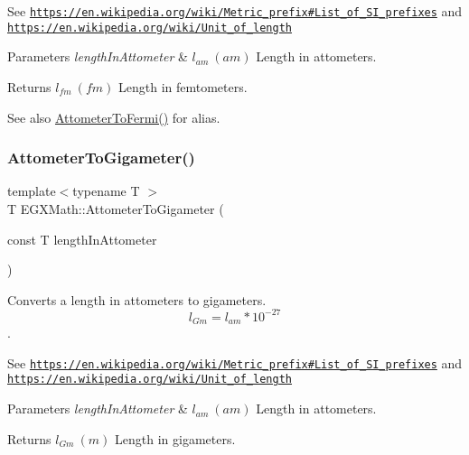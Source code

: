 See \href{https://en.wikipedia.org/wiki/Metric_prefix#List_of_SI_prefixes}{\tt https\+://en.\+wikipedia.\+org/wiki/\+Metric\+\_\+prefix\#\+List\+\_\+of\+\_\+\+S\+I\+\_\+prefixes} and \href{https://en.wikipedia.org/wiki/Unit_of_length}{\tt https\+://en.\+wikipedia.\+org/wiki/\+Unit\+\_\+of\+\_\+length} 
\begin{DoxyParams}{Parameters}
{\em length\+In\+Attometer} & $ l_{am}\ (am)$ Length in attometers. \\
\hline
\end{DoxyParams}
\begin{DoxyReturn}{Returns}
$ l_{fm}\ (fm)$ Length in femtometers. 
\end{DoxyReturn}
\begin{DoxySeeAlso}{See also}
\mbox{\hyperlink{group___e_g_x_math-_conversions-_length_conversions-_s_i-_attometer-_non-_s_i_ga7dc342fa730e646b020d60aa6c2848ef}{Attometer\+To\+Fermi()}} for alias. 
\end{DoxySeeAlso}
\mbox{\label{group___e_g_x_math-_conversions-_length_conversions-_s_i-_attometer-_s_i_ga6d8498c20f3df80b922e6cb076c35fb8}} 
\subsubsection{\texorpdfstring{Attometer\+To\+Gigameter()}{AttometerToGigameter()}}
{\footnotesize\ttfamily template$<$typename T $>$ \\
T E\+G\+X\+Math\+::\+Attometer\+To\+Gigameter (\begin{DoxyParamCaption}\item[{const T}]{length\+In\+Attometer }\end{DoxyParamCaption})}



Converts a length in attometers to gigameters. \[ l_{Gm}=l_{am} * 10^{-27} \]. 

See \href{https://en.wikipedia.org/wiki/Metric_prefix#List_of_SI_prefixes}{\tt https\+://en.\+wikipedia.\+org/wiki/\+Metric\+\_\+prefix\#\+List\+\_\+of\+\_\+\+S\+I\+\_\+prefixes} and \href{https://en.wikipedia.org/wiki/Unit_of_length}{\tt https\+://en.\+wikipedia.\+org/wiki/\+Unit\+\_\+of\+\_\+length} 
\begin{DoxyParams}{Parameters}
{\em length\+In\+Attometer} & $ l_{am}\ (am)$ Length in attometers. \\
\hline
\end{DoxyParams}
\begin{DoxyReturn}{Returns}
$ l_{Gm}\ (m)$ Length in gigameters. 
\end{DoxyReturn}
\mbox{\label{group___e_g_x_math-_conversions-_length_conversions-_s_i-_attometer-_s_i_gab810b8625e44d4bb227bdff1b0ab2056}} 
